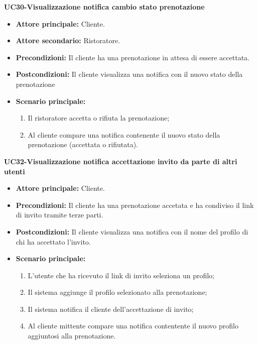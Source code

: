 \textbf{UC30-Visualizzazione notifica cambio stato prenotazione}
\begin{itemize}
\item \textbf{Attore principale:} Cliente.
\item \textbf{Attore secondario:} Ristoratore.
\item \textbf{Precondizioni:} Il cliente ha una prenotazione in attesa di essere accettata.
\item \textbf{Postcondizioni:} Il cliente visualizza una notifica con il nuovo stato della prenotazione
\item \textbf{Scenario principale:}
\begin{enumerate}
    \item Il ristoratore accetta o rifiuta la prenotazione;
    \item Al cliente compare una notifica contenente il nuovo stato della prenotazione (accettata o rifiutata).
\end{enumerate}
\end{itemize}

\textbf{UC32-Visualizzazione notifica accettazione invito da parte di altri utenti}
\begin{itemize}
\item \textbf{Attore principale:} Cliente.
\item \textbf{Precondizioni:} Il cliente ha una prenotazione accetata e ha condiviso il link di invito tramite terze parti.
\item \textbf{Postcondizioni:} Il cliente visualizza una notifica con il nome del profilo di chi ha accettato l'invito.
\item \textbf{Scenario principale:}
\begin{enumerate}
    \item L'utente che ha ricevuto il link di invito seleziona un profilo;
    \item Il sistema aggiunge il profilo selezionato alla prenotazione;
    \item Il sistema notifica il cliente dell'accettazione di invito;
    \item Al cliente mittente compare una notifica contentente il nuovo profilo aggiuntosi alla prenotazione.
\end{enumerate}
\end{itemize}


